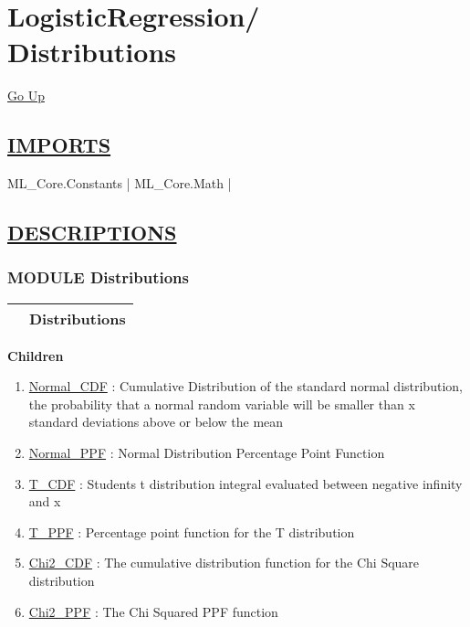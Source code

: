 \chapter*{\color{headfile}
{\large LogisticRegression\slash\hspace{0pt}}
 \\
Distributions
}
\hypertarget{ecldoc:toc:LogisticRegression.Distributions}{}
\hyperlink{ecldoc:toc:root/LogisticRegression}{Go Up}

\section*{\underline{\textsf{IMPORTS}}}
\begin{doublespace}
{\large
ML\_Core.Constants |
ML\_Core.Math |
}
\end{doublespace}

\section*{\underline{\textsf{DESCRIPTIONS}}}
\subsection*{\textsf{\colorbox{headtoc}{\color{white} MODULE}
Distributions}}

\hypertarget{ecldoc:LogisticRegression.Distributions}{}

{\renewcommand{\arraystretch}{1.5}
\begin{tabularx}{\textwidth}{|>{\raggedright\arraybackslash}l|X|}
\hline
\hspace{0pt}\mytexttt{\color{red} } & \textbf{Distributions} \\
\hline
\end{tabularx}
}

\par


\textbf{Children}
\begin{enumerate}
\item \hyperlink{ecldoc:logisticregression.distributions.normal_cdf}{Normal\_CDF}
: Cumulative Distribution of the standard normal distribution, the probability that a normal random variable will be smaller than x standard deviations above or below the mean
\item \hyperlink{ecldoc:logisticregression.distributions.normal_ppf}{Normal\_PPF}
: Normal Distribution Percentage Point Function
\item \hyperlink{ecldoc:logisticregression.distributions.t_cdf}{T\_CDF}
: Students t distribution integral evaluated between negative infinity and x
\item \hyperlink{ecldoc:logisticregression.distributions.t_ppf}{T\_PPF}
: Percentage point function for the T distribution
\item \hyperlink{ecldoc:logisticregression.distributions.chi2_cdf}{Chi2\_CDF}
: The cumulative distribution function for the Chi Square distribution
\item \hyperlink{ecldoc:logisticregression.distributions.chi2_ppf}{Chi2\_PPF}
: The Chi Squared PPF function
\end{enumerate}

